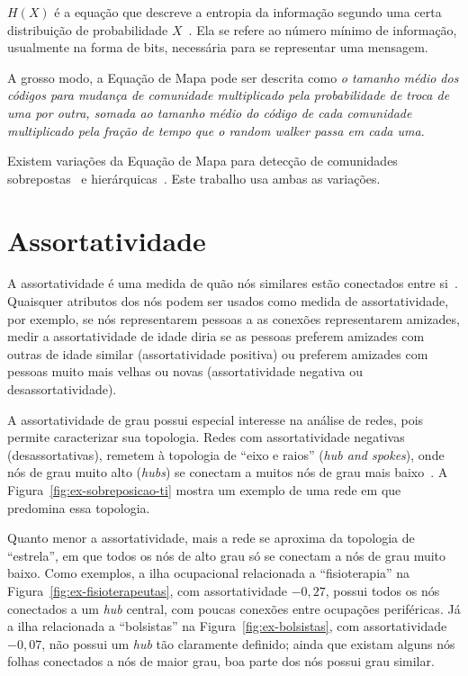 \documentclass[
  article,
  11pt,
  a4paper,
  english,
  brazil,
  sumario=tradicional]{abntex2}
\begin{document}
$H(X)$ é a equação que descreve a entropia da informação segundo uma certa distribuição de probabilidade $X$~\cite{Shannon1948-ic}. Ela se refere ao número mínimo de informação, usualmente na forma de bits, necessária para se representar uma mensagem.

A grosso modo, a Equação de Mapa pode ser descrita como \textit{o tamanho médio dos códigos para mudança de comunidade multiplicado pela probabilidade de troca de uma por outra, somada ao tamanho médio do código de cada comunidade multiplicado pela fração de tempo que o \textit{random walker} passa em cada uma}.

Existem variações da Equação de Mapa para detecção de comunidades sobrepostas~\cite{Viamontes_Esquivel2011-it} e hierárquicas~\cite{Rosvall2011-yi}. Este trabalho usa ambas as variações.


\section{Assortatividade} \label{sec:assortatividade}

A assortatividade é uma medida de quão nós similares estão conectados entre si~\cite{Newman2003-jn}. Quaisquer atributos dos nós podem ser usados como medida de assortatividade, por exemplo, se nós representarem pessoas a as conexões representarem amizades, medir a assortatividade de idade diria se as pessoas preferem amizades com outras de idade similar (assortatividade positiva) ou preferem amizades com pessoas muito mais velhas ou novas (assortatividade negativa ou desassortatividade).

A assortatividade de grau possui especial interesse na análise de redes, pois permite caracterizar sua topologia. Redes com assortatividade negativas (desassortativas), remetem à topologia de \enquote{eixo e raios} (\textit{hub and spokes}), onde nós de grau muito alto (\textit{hubs}) se conectam a muitos nós de grau mais baixo~\cite{Barabasi2016-rn}. A Figura~\ref{fig:ex-sobreposicao-ti} mostra um exemplo de uma rede em que predomina essa topologia.

Quanto menor a assortatividade, mais a rede se aproxima da topologia de \enquote{estrela}, em que todos os nós de alto grau só se conectam a nós de grau muito baixo. Como exemplos, a ilha ocupacional relacionada a \enquote{fisioterapia} na Figura~\ref{fig:ex-fisioterapeutas}, com assortatividade $-0,27$, possui todos os nós conectados a um \textit{hub} central, com poucas conexões entre ocupações periféricas. Já a ilha relacionada a \enquote{bolsistas} na Figura~\ref{fig:ex-bolsistas}, com assortatividade $-0,07$, não possui um \textit{hub} tão claramente definido; ainda que existam alguns nós folhas conectados a nós de maior grau, boa parte dos nós possui grau similar.
\end{document}
